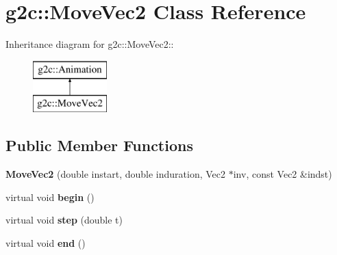 \hypertarget{classg2c_1_1_move_vec2}{
\section{g2c::MoveVec2 Class Reference}
\label{classg2c_1_1_move_vec2}
}
Inheritance diagram for g2c::MoveVec2::\begin{figure}[H]
\begin{center}
\leavevmode
\includegraphics[height=2cm]{classg2c_1_1_move_vec2}
\end{center}
\end{figure}
\subsection*{Public Member Functions}
\begin{DoxyCompactItemize}
\item 
\hypertarget{classg2c_1_1_move_vec2_a48e994e1126cb392be0a85be44d4f360}{
{\bfseries MoveVec2} (double instart, double induration, Vec2 $\ast$inv, const Vec2 \&indst)}
\label{classg2c_1_1_move_vec2_a48e994e1126cb392be0a85be44d4f360}

\item 
\hypertarget{classg2c_1_1_move_vec2_a705bc4f8abd8d37d908ca0a73d92b90c}{
virtual void {\bfseries begin} ()}
\label{classg2c_1_1_move_vec2_a705bc4f8abd8d37d908ca0a73d92b90c}

\item 
\hypertarget{classg2c_1_1_move_vec2_ac1e6597c52356e77bfc951a78e5a5cd1}{
virtual void {\bfseries step} (double t)}
\label{classg2c_1_1_move_vec2_ac1e6597c52356e77bfc951a78e5a5cd1}

\item 
\hypertarget{classg2c_1_1_move_vec2_ae79f50336f80d7155fc3b4c6f577cc85}{
virtual void {\bfseries end} ()}
\label{classg2c_1_1_move_vec2_ae79f50336f80d7155fc3b4c6f577cc85}

\end{DoxyCompactItemize}
